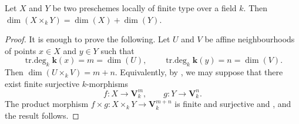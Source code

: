 \begin{corollary}[4.1.5]
\label{IV.4.1.5}
Let $X$ and $Y$ be two preschemes locally of finite type over a field $k$.
Then $\dim(X\times_k Y)=\dim(X)+\dim(Y)$.
\end{corollary}

\begin{proof}
It is enough to prove the following.
Let $U$ and $V$ be affine neighbourhoods of points $x\in X$ and $y\in Y$ such that
\[
\operatorname{tr.deg}_k\boldsymbol{k}(x)=m=\dim(U),
\qquad
\operatorname{tr.deg}_k\boldsymbol{k}(y)=n=\dim(V).
\]
Then $\dim(U\times_k V)=m+n$.
Equivalently, by , we may suppose that there exist finite surjective $k$-morphisms
\[
f:X\longrightarrow\mathbf{V}_k^m,
\qquad
g:Y\longrightarrow\mathbf{V}_k^n.
\]
The product morphism $f\times g:X\times_k Y\longrightarrow\mathbf{V}_k^{m+n}$
is finite and surjective  and , and the result follows.
\end{proof}
